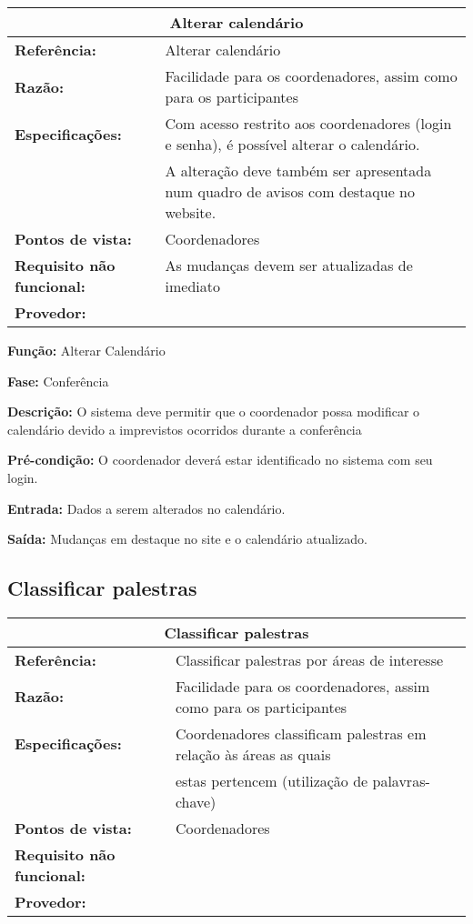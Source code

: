 \documentclass[letter]{article}
\begin{document}
%
\begin{table}[h!]

\begin{center}
\begin{tabular}{|ll|}
\hline 
\multicolumn{2}{|c|}{\textbf{Alterar calendário}}\tabularnewline
\hline
\textbf{Referência:} & Alterar calendário\tabularnewline
\textbf{Razão:} & Facilidade para os coordenadores, assim como para os participantes\tabularnewline
\textbf{Especificações:} & Com acesso restrito aos coordenadores (login e senha), é possível
alterar o calendário.\tabularnewline
 &  A alteração deve também ser apresentada num quadro de avisos com
destaque no website.\tabularnewline
\textbf{Pontos de vista:} & Coordenadores \tabularnewline
\textbf{Requisito não funcional:} & As mudanças devem ser atualizadas de imediato\tabularnewline
\textbf{Provedor:} & \tabularnewline
\hline
\end{tabular}
\end{center}
\end{table}


\textbf{Função:} Alterar Calendário

\textbf{Fase:}  Conferência

\textbf{Descrição:}  O sistema deve permitir que o coordenador possa modificar o calendário devido a imprevistos ocorridos durante a conferência

\textbf{Pré-condição:}  O coordenador deverá estar identificado no sistema com seu login.

\textbf{Entrada:} Dados a serem alterados no calendário.

\textbf{Saída:}  Mudanças em destaque no site e o calendário atualizado.


\newpage
\subsection{Classificar palestras}



\begin{table}[h!]

\begin{center}
\begin{tabular}{|ll|}
\hline 
\multicolumn{2}{|c|}{\textbf{Classificar palestras}}\tabularnewline
\hline
\textbf{Referência:} & Classificar palestras por áreas de interesse\tabularnewline
\textbf{Razão:} & Facilidade para os coordenadores, assim como para os participantes\tabularnewline
\textbf{Especificações:} & Coordenadores classificam palestras em relação às áreas as quais\tabularnewline
 &  estas pertencem (utilização de palavras-chave)\tabularnewline
\textbf{Pontos de vista:} & Coordenadores\tabularnewline
\textbf{Requisito não funcional:} & \tabularnewline
\textbf{Provedor:} & \tabularnewline
\hline
\end{tabular}
\end{center}
\end{table}
\end{document}
